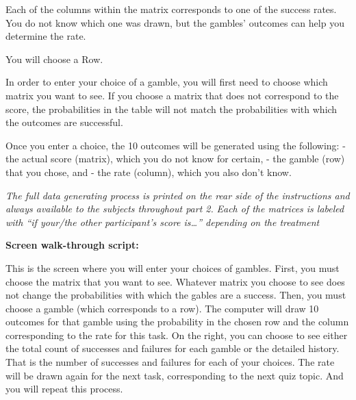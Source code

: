 \documentclass[
  12pt,
]{article}
\begin{document}
Each of the columns within the matrix corresponds to one of the success
rates. You do not know which one was drawn, but the gambles' outcomes
can help you determine the rate.

You will choose a Row.

In order to enter your choice of a gamble, you will first need to choose
which matrix you want to see. If you choose a matrix that does not
correspond to the score, the probabilities in the table will not match
the probabilities with which the outcomes are successful.

Once you enter a choice, the 10 outcomes will be generated using the
following: - the actual score (matrix), which you do not know for
certain, - the gamble (row) that you chose, and - the rate (column),
which you also don't know.

\emph{The full data generating process is printed on the rear side of
the instructions and always available to the subjects throughout part
2.} \emph{Each of the matrices is labeled with ``if your/the other
participant's score is\ldots{}'' depending on the treatment}

\textbf{Screen walk-through script:}

This is the screen where you will enter your choices of gambles. First,
you must choose the matrix that you want to see. Whatever matrix you
choose to see does not change the probabilities with which the gables
are a success. Then, you must choose a gamble (which corresponds to a
row). The computer will draw 10 outcomes for that gamble using the
probability in the chosen row and the column corresponding to the rate
for this task. On the right, you can choose to see either the total
count of successes and failures for each gamble or the detailed history.
That is the number of successes and failures for each of your choices.
The rate will be drawn again for the next task, corresponding to the
next quiz topic. And you will repeat this process.

\newpage

\renewcommand\refname{References}
  
\end{document}
